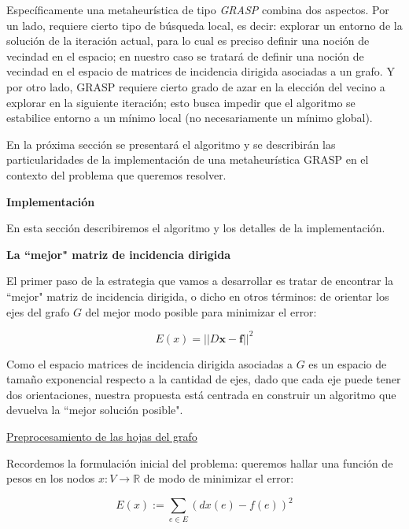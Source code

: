 \documentclass[a4paper,11pt]{article}
\begin{document}
Específicamente una metaheurística de tipo \textit{GRASP} combina dos 
aspectos. Por un lado, requiere cierto tipo de búsqueda local, es decir: 
explorar un entorno de la solución de la iteración actual, para lo cual 
es preciso definir una noción de vecindad en el espacio; en nuestro caso 
se tratará de definir una noción de vecindad en el espacio de matrices 
de incidencia dirigida asociadas a un grafo. Y por otro lado, GRASP 
requiere cierto grado de azar en la elección del vecino a explorar en 
la siguiente iteración; esto busca impedir que el algoritmo se 
estabilice entorno a un mínimo local (no necesariamente un mínimo 
global). 

\bigskip

En la próxima sección se presentará el algoritmo y se describirán las 
particularidades de la implementación de una metaheurística GRASP en el 
contexto del problema que queremos resolver.

\bigskip

\textbf{Implementación}

\bigskip

En esta sección describiremos el algoritmo y los detalles de la 
implementación.

\bigskip

\textbf{La ``mejor" matriz de incidencia dirigida}

\bigskip

El primer paso de la estrategia que vamos a desarrollar es tratar de 
encontrar la ``mejor" matriz de incidencia dirigida, o dicho en otros 
términos: de orientar los ejes del grafo $G$ del mejor modo posible para 
minimizar el error:

$$E(x) = ||D\bm{x}-\bm{f}||^2$$
 
Como el espacio matrices de incidencia dirigida asociadas a $G$ es un 
espacio de tamaño exponencial respecto a la cantidad de ejes, dado que 
cada eje puede tener dos orientaciones, nuestra propuesta está centrada 
en construir un algoritmo que devuelva la ``mejor solución posible".

\bigskip

\underline{Preprocesamiento de las hojas del grafo}

\bigskip

Recordemos la formulación inicial del problema: queremos hallar una 
función de pesos en los nodos $x: V \rightarrow \mathbb{R}$ de modo de 
minimizar el error:

$$E(x) := \sum_{e \in E} (dx(e) - f(e))^2$$
\end{document}
